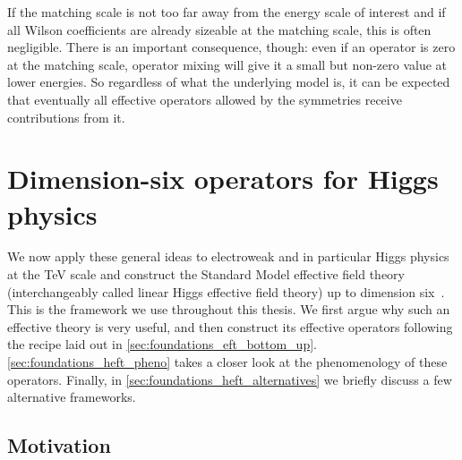 If the matching scale is not too far away from the energy scale of
interest and if all Wilson coefficients are already sizeable at the
matching scale, this is often negligible. There is an important
consequence, though: even if an operator is zero at the matching
scale, operator mixing will give it a small but non-zero value at
lower energies. So regardless of what the underlying model is, it can
be expected that eventually all effective operators allowed by the
symmetries receive contributions from it. 



\section{Dimension-six operators for Higgs physics}
\label{sec:foundations_higgs_eft}

We now apply these general ideas to electroweak and in particular
Higgs physics at the TeV scale and construct the Standard Model
effective field theory (interchangeably called linear Higgs effective
field theory) up to dimension six~\cite{Burges:1983zg, Leung:1984ni,
  Buchmuller:1985jz, Arzt:1994gp}. This is the framework we use
throughout this thesis. We first argue why such an effective
theory is very useful, and then construct its effective operators
following the recipe laid out in
\autoref{sec:foundations_eft_bottom_up}. \autoref{sec:foundations_heft_pheno}
takes a closer look at the phenomenology of these
operators. Finally, in \autoref{sec:foundations_heft_alternatives}
we briefly discuss a few alternative frameworks.


  

\subsection{Motivation}
\label{sec:foundations_heft_motivation}



